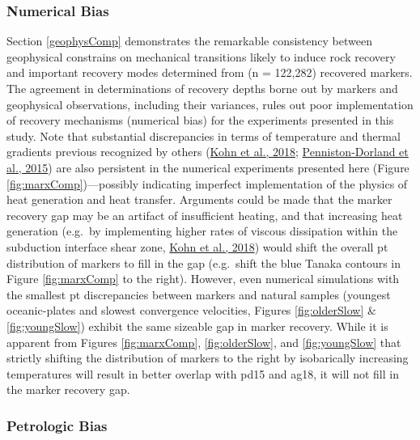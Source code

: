 \hypertarget{numerical-bias}{%
\subsubsection{Numerical Bias}\label{numerical-bias}}

Section \ref{geophysComp} demonstrates the remarkable consistency between geophysical constrains on mechanical transitions likely to induce rock recovery and important recovery modes determined from (n = 122,282) recovered markers. The agreement in determinations of recovery depths borne out by markers and geophysical observations, including their variances, rules out poor implementation of recovery mechanisms (numerical bias) for the experiments presented in this study. Note that substantial discrepancies in terms of temperature and thermal gradients previous recognized by others (\protect\hyperlink{ref-kohn2018}{Kohn et al., 2018}; \protect\hyperlink{ref-penniston2015}{Penniston-Dorland et al., 2015}) are also persistent in the numerical experiments presented here (Figure \ref{fig:marxComp})---possibly indicating imperfect implementation of the physics of heat generation and heat transfer. Arguments could be made that the marker recovery gap may be an artifact of insufficient heating, and that increasing heat generation (e.g.~by implementing higher rates of viscous dissipation within the subduction interface shear zone, \protect\hyperlink{ref-kohn2018}{Kohn et al., 2018}) would shift the overall \gls{pt} distribution of markers to fill in the gap (e.g.~shift the blue Tanaka contours in Figure \ref{fig:marxComp} to the right). However, even numerical simulations with the smallest \gls{pt} discrepancies between markers and natural samples (youngest oceanic-plates and slowest convergence velocities, Figures \ref{fig:olderSlow} \& \ref{fig:youngSlow}) exhibit the same sizeable gap in marker recovery. While it is apparent from Figures \ref{fig:marxComp}, \ref{fig:olderSlow}, and \ref{fig:youngSlow} that strictly shifting the distribution of markers to the right by isobarically increasing temperatures will result in better overlap with pd15 and ag18, it will not fill in the marker recovery gap.

\hypertarget{petrologic-bias}{%
\subsubsection{Petrologic Bias}\label{petrologic-bias}}

